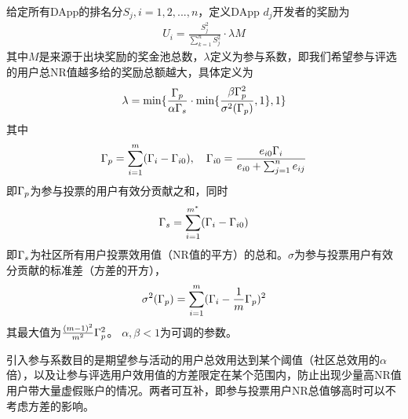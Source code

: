 给定所有DApp的排名分$S_j,i=1,2,...,n$，定义DApp $d_j$开发者的奖励为
\begin{align}
\label{eq:distribution}
U_i = \frac{S_j^2}{\sum_{k=1}^n S_j^2}\cdot \lambda M
\end{align}
其中$M$是来源于出块奖励的奖金池总数，$\lambda $定义为参与系数，即我们希望参与评选的用户总NR值越多给的奖励总额越大，具体定义为
\begin{align}
\lambda=\min\{\frac{\Gamma_p}{\alpha \Gamma_s }\cdot \min\{\frac{\beta\Gamma_p^2 }{\sigma^2(\Gamma_p)},1\},1\}
\end{align}
其中$$\Gamma_p = \sum_{i=1}^m (\Gamma_i-\Gamma_{i0}),~~~\Gamma_{i0} = \frac{e_{i0}\Gamma_i}{e_{i0}+\sum_{j=1}^n {e_{ij}}}$$
即$\Gamma_p$为参与投票的用户有效分贡献之和，同时$$\Gamma_s = \sum_{i=1}^{m^*} (\Gamma_i-\Gamma_{i0})$$即$\Gamma_s$为社区所有用户投票效用值（NR值的平方）的总和。$\sigma$为参与投票用户有效分贡献的标准差（方差的开方），
$$ \sigma^2(\Gamma_p) = \sum_{i=1}^m (\Gamma_i-\frac{1}{m}\Gamma_p)^2 $$
其最大值为$\frac{(m-1)^2}{m^2}\Gamma_p^2$。
$\alpha,\beta<1$为可调的参数。

引入参与系数目的是期望参与活动的用户总效用达到某个阈值（社区总效用的$\alpha$倍），以及让参与评选用户效用值的方差限定在某个范围内，防止出现少量高NR值用户带大量虚假账户的情况。两者可互补，即参与投票用户NR总值够高时可以不考虑方差的影响。

